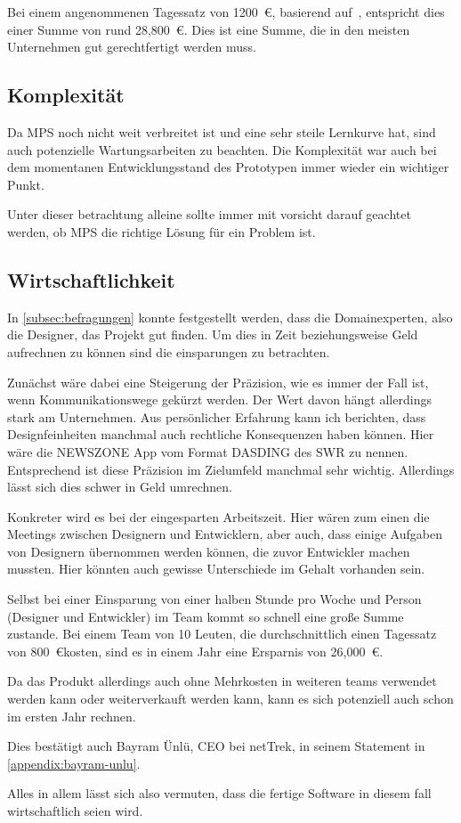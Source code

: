 Bei einem angenommenen Tagessatz von 1200~\euro, basierend auf~\cite{metrics-germany-gmbh-2021}, entspricht dies einer Summe von rund 28,800~\euro.
Dies ist eine Summe, die in den meisten Unternehmen gut gerechtfertigt werden muss.

\subsection{Komplexität}\label{subsec:komplexitat}
Da \ac{MPS} noch nicht weit verbreitet ist und eine sehr steile Lernkurve hat, sind auch potenzielle Wartungsarbeiten zu beachten.
Die Komplexität war auch bei dem momentanen Entwicklungsstand des Prototypen immer wieder ein wichtiger Punkt.

Unter dieser betrachtung alleine sollte immer mit vorsicht darauf geachtet werden, ob \ac{MPS} die richtige Lösung für ein Problem ist.
\lipsum[5]

\subsection{Wirtschaftlichkeit}\label{subsec:wirtschaftlichkeit}
In \autoref{subsec:befragungen} konnte festgestellt werden, dass die Domainexperten, also die Designer, das Projekt gut finden.
Um dies in Zeit beziehungsweise Geld aufrechnen zu können sind die einsparungen zu betrachten.

Zunächst wäre dabei eine Steigerung der Präzision, wie es immer der Fall ist, wenn Kommunikationswege gekürzt werden.
Der Wert davon hängt allerdings stark am Unternehmen.
Aus persönlicher Erfahrung kann ich berichten, dass Designfeinheiten manchmal auch rechtliche Konsequenzen haben können.
Hier wäre die NEWSZONE App vom Format DASDING des \ac{SWR} zu nennen.
Entsprechend ist diese Präzision im Zielumfeld manchmal sehr wichtig.
Allerdings lässt sich dies schwer in Geld umrechnen.

Konkreter wird es bei der eingesparten Arbeitszeit.
Hier wären zum einen die Meetings zwischen Designern und Entwicklern, aber auch, dass einige Aufgaben von Designern übernommen werden können, die zuvor Entwickler machen mussten.
Hier könnten auch gewisse Unterschiede im Gehalt vorhanden sein.

Selbst bei einer Einsparung von einer halben Stunde pro Woche und Person (Designer und Entwickler) im Team kommt so schnell eine große Summe zustande.
Bei einem Team von 10 Leuten, die durchschnittlich einen Tagessatz von 800~\euro kosten, sind es in einem Jahr eine Ersparnis von 26,000~\euro.

Da das Produkt allerdings auch ohne Mehrkosten in weiteren teams verwendet werden kann oder weiterverkauft werden kann, kann es sich potenziell auch schon im ersten Jahr rechnen.

Dies bestätigt auch Bayram Ünlü, \ac{CEO} bei \ac{netTrek}, in seinem Statement in \autoref{appendix:bayram-unlu}.

Alles in allem lässt sich also vermuten, dass die fertige Software in diesem fall wirtschaftlich seien wird.
